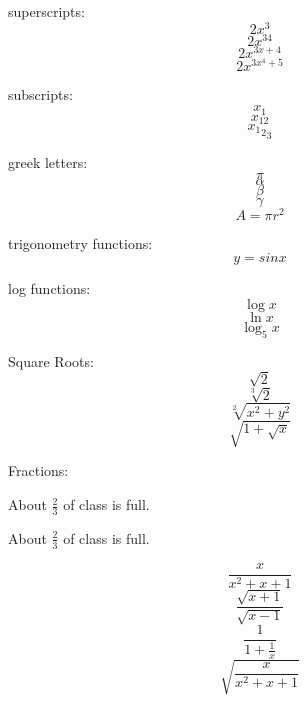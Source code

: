 \documentclass[11pt]{article}
\begin{document}
superscripts: $$2x^3$$
$$2x^{34}$$
$$2x^{3x+4}$$
$$2x^{3x^4+5}$$

subscripts: $$x_1$$
$$x_{12}$$
$${{x_1}_2}_3$$

greek letters: 
$$\pi$$
$$\alpha$$
$$\beta$$
$$\gamma$$
$$A=\pi r^2$$


trigonometry functions:
$$y=sin{x}$$


log functions:
$$\log{x}$$
$$\ln{x}$$
$$\log_5{x}$$


Square Roots:
$$\sqrt{2}$$
$$\sqrt[3]{2}$$
$$\sqrt[2]{x^2+y^2}$$
$$\sqrt{1+\sqrt{x}}$$


Fractions:

About $\frac{2}{3}$ of class is full.

About $\displaystyle{\frac{2}{3}}$ of class is full.

$$\frac{x}{x^2+x+1}$$
$$\frac{\sqrt{x+1}}{\sqrt{x-1}}$$
$$\frac{1}{1+\frac{1}{x}}$$
$$\sqrt{\frac{x}{x^2+x+1}}$$
\end{document}
